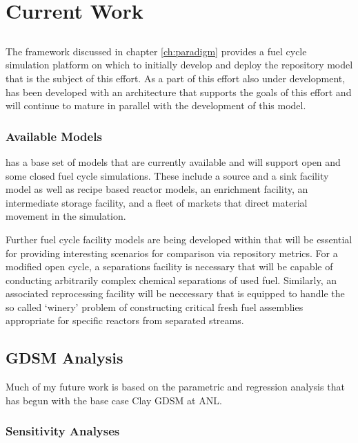 \chapter{Current Work}\label{ch:current}

\section{\Cyclus}

The \Cyclus framework discussed in chapter \ref{ch:paradigm} provides a fuel 
cycle simulation platform on which to initially develop and deploy the 
repository model that is the subject of this effort. As a part of this effort 
also under development, \Cyclus has been developed with an architecture that 
supports the goals of this effort and will continue to mature in parallel with 
the development of this model.

\subsection{Available Models}

\Cyclus has a base set of models that are currently available and will support 
open and some closed fuel cycle simulations. These include a source and a sink 
facility model as well as recipe based reactor models, an enrichment facility, 
an intermediate storage facility, and a fleet of markets that direct material 
movement in the simulation.

Further fuel cycle facility models are being developed within \Cyclus  that 
will be essential for providing interesting scenarios for comparison via 
repository metrics. For a modified open cycle, a separations facility is 
necessary that will be capable of conducting arbitrarily complex chemical 
separations of used fuel. Similarly, an associated reprocessing facility  will 
be neccessary that is equipped to handle the so called `winery' problem of 
constructing critical fresh fuel assemblies appropriate for specific reactors 
from separated streams.


\section{GDSM Analysis}

Much of my future work is based on the parametric and regression analysis that
has begun with the base case Clay \gls{GDSM} at \gls{ANL}.

\subsection{Sensitivity Analyses}

